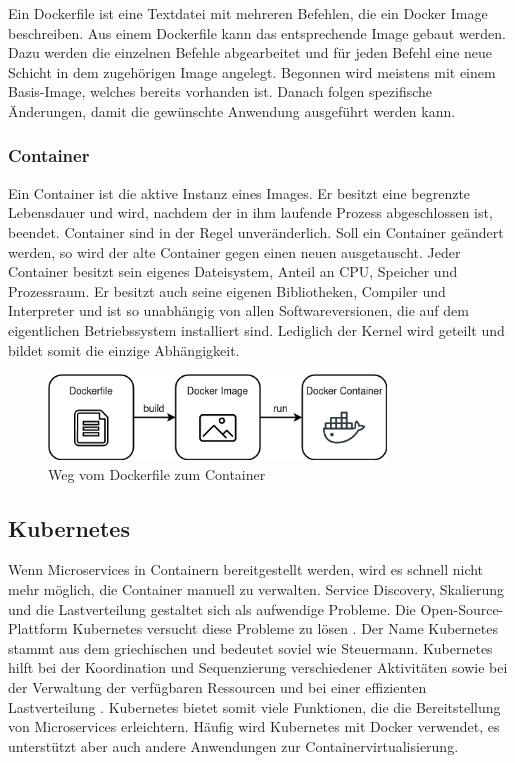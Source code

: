 Ein Dockerfile ist eine Textdatei mit mehreren Befehlen, die ein Docker Image beschreiben. Aus einem Dockerfile kann das entsprechende Image gebaut werden. Dazu werden die einzelnen Befehle abgearbeitet und für jeden Befehl eine neue Schicht in dem zugehörigen Image angelegt. Begonnen wird meistens mit einem Basis-Image, welches bereits vorhanden ist. Danach folgen spezifische Änderungen, damit die gewünschte Anwendung ausgeführt werden kann.

\subsubsection{Container}
Ein Container ist die aktive Instanz eines Images. Er besitzt eine begrenzte Lebensdauer und wird, nachdem der in ihm laufende Prozess abgeschlossen ist, beendet. Container sind in der Regel unveränderlich. Soll ein Container geändert werden, so wird der alte Container gegen einen neuen ausgetauscht. Jeder Container besitzt sein eigenes Dateisystem, Anteil an CPU, Speicher und Prozessraum. Er besitzt auch seine eigenen Bibliotheken, Compiler und Interpreter und ist so unabhängig von allen Softwareversionen, die auf dem eigentlichen Betriebssystem installiert sind. Lediglich der Kernel wird geteilt und bildet somit die einzige Abhängigkeit. 

\begin{figure}[H] 
    \centering
    \includegraphics[width=0.8\textwidth]{figures/DockerFileImageContainer.png}
    \caption{Weg vom Dockerfile zum Container}
\end{figure}

\subsection{Kubernetes}

Wenn Microservices in Containern bereitgestellt werden, wird es schnell nicht mehr möglich, die Container manuell zu verwalten. Service Discovery, Skalierung und die Lastverteilung gestaltet sich als aufwendige Probleme. Die Open-Source-Plattform Kubernetes versucht diese Probleme zu lösen \parencite[vgl.][]{linuxfoundationKubernetes2022}. Der Name \glqq Kubernetes\grqq{} stammt aus dem griechischen und bedeutet soviel wie Steuermann. Kubernetes hilft bei der Koordination und Sequenzierung verschiedener Aktivitäten sowie bei der Verwaltung der verfügbaren Ressourcen und bei einer effizienten Lastverteilung \parencite[vgl.][S. 11]{arundelCloud2019}. Kubernetes bietet somit viele Funktionen, die die Bereitstellung von Microservices erleichtern. Häufig wird Kubernetes mit Docker verwendet, es unterstützt aber auch andere Anwendungen zur Containervirtualisierung.

